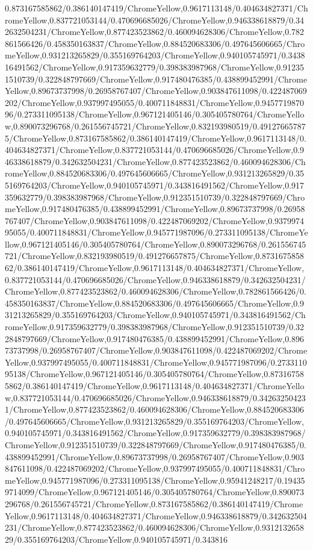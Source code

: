 {\begin{tikzternal}
{0.873167585862/0.386140147419/ChromeYellow,0.9617113148/0.404634827371/ChromeYellow,0.837721053144/0.470696685026/ChromeYellow,0.946338618879/0.342632504231/ChromeYellow,0.877423523862/0.460094628306/ChromeYellow,0.782861566426/0.458350163837/ChromeYellow,0.884520683306/0.497645606665/ChromeYellow,0.931213265829/0.355169764203/ChromeYellow,0.940105745971/0.343816491562/ChromeYellow,0.917359632779/0.398383987968/ChromeYellow,0.912351510739/0.322848797669/ChromeYellow,0.917480476385/0.438899452991/ChromeYellow,0.89673737998/0.26958767407/ChromeYellow,0.903847611098/0.422487069202/ChromeYellow,0.937997495055/0.400711848831/ChromeYellow,0.945771987096/0.273311095138/ChromeYellow,0.967121405146/0.305405780764/ChromeYellow,0.890073296768/0.261556745721/ChromeYellow,0.832193980519/0.491276657875/ChromeYellow,0.873167585862/0.386140147419/ChromeYellow,0.9617113148/0.404634827371/ChromeYellow,0.837721053144/0.470696685026/ChromeYellow,0.946338618879/0.342632504231/ChromeYellow,0.877423523862/0.460094628306/ChromeYellow,0.884520683306/0.497645606665/ChromeYellow,0.931213265829/0.355169764203/ChromeYellow,0.940105745971/0.343816491562/ChromeYellow,0.917359632779/0.398383987968/ChromeYellow,0.912351510739/0.322848797669/ChromeYellow,0.917480476385/0.438899452991/ChromeYellow,0.89673737998/0.26958767407/ChromeYellow,0.903847611098/0.422487069202/ChromeYellow,0.937997495055/0.400711848831/ChromeYellow,0.945771987096/0.273311095138/ChromeYellow,0.967121405146/0.305405780764/ChromeYellow,0.890073296768/0.261556745721/ChromeYellow,0.832193980519/0.491276657875/ChromeYellow,0.873167585862/0.386140147419/ChromeYellow,0.9617113148/0.404634827371/ChromeYellow,0.837721053144/0.470696685026/ChromeYellow,0.946338618879/0.342632504231/ChromeYellow,0.877423523862/0.460094628306/ChromeYellow,0.782861566426/0.458350163837/ChromeYellow,0.884520683306/0.497645606665/ChromeYellow,0.931213265829/0.355169764203/ChromeYellow,0.940105745971/0.343816491562/ChromeYellow,0.917359632779/0.398383987968/ChromeYellow,0.912351510739/0.322848797669/ChromeYellow,0.917480476385/0.438899452991/ChromeYellow,0.89673737998/0.26958767407/ChromeYellow,0.903847611098/0.422487069202/ChromeYellow,0.937997495055/0.400711848831/ChromeYellow,0.945771987096/0.273311095138/ChromeYellow,0.967121405146/0.305405780764/ChromeYellow,0.873167585862/0.386140147419/ChromeYellow,0.9617113148/0.404634827371/ChromeYellow,0.837721053144/0.470696685026/ChromeYellow,0.946338618879/0.342632504231/ChromeYellow,0.877423523862/0.460094628306/ChromeYellow,0.884520683306/0.497645606665/ChromeYellow,0.931213265829/0.355169764203/ChromeYellow,0.940105745971/0.343816491562/ChromeYellow,0.917359632779/0.398383987968/ChromeYellow,0.912351510739/0.322848797669/ChromeYellow,0.917480476385/0.438899452991/ChromeYellow,0.89673737998/0.26958767407/ChromeYellow,0.903847611098/0.422487069202/ChromeYellow,0.937997495055/0.400711848831/ChromeYellow,0.945771987096/0.273311095138/ChromeYellow,0.95941248217/0.194359714099/ChromeYellow,0.967121405146/0.305405780764/ChromeYellow,0.890073296768/0.261556745721/ChromeYellow,0.873167585862/0.386140147419/ChromeYellow,0.9617113148/0.404634827371/ChromeYellow,0.946338618879/0.342632504231/ChromeYellow,0.877423523862/0.460094628306/ChromeYellow,0.931213265829/0.355169764203/ChromeYellow,0.940105745971/0.343816}
\end{tikzternal}}
